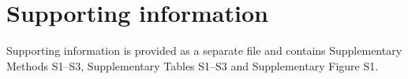 \documentclass[12pt,a4paper]{article}
\begin{document}
\section*{Supporting information}

Supporting information is provided as a separate file and contains Supplementary Methods
S1--S3, Supplementary Tables S1--S3 and Supplementary Figure S1.
\end{document}
